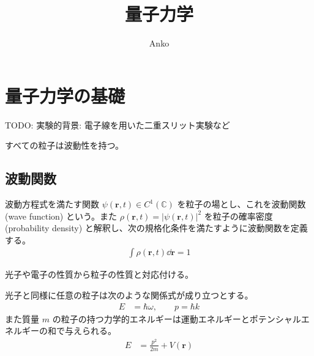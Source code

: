 \documentclass[uplatex,dvipdfmx,a4paper,11pt]{jlreq}
\title{量子力学}
\author{Anko}
\newcommand{\CC}{\mathbb{C}}
\newcommand{\rr}{\bm{r}}
\theoremstyle{definition}
\begin{document}
\maketitle
\tableofcontents
\clearpage

\section{量子力学の基礎}
TODO: 実験的背景: 電子線を用いた二重スリット実験など
\begin{axiom}[粒子の波動性]
  すべての粒子は波動性を持つ。
\end{axiom}

\subsection{波動関数}
\begin{definition}[波動関数]
  波動方程式を満たす関数 $\psi(\rr, t)\in C^1(\CC)$ を粒子の場とし、これを波動関数 (wave function) という。また $\rho(\rr, t) = |\psi(\rr, t)|^2$ を粒子の確率密度 (probability density) と解釈し、次の規格化条件を満たすように波動関数を定義する。
  \begin{align}
    \int\rho(\rr, t)\dd{\rr} = 1
  \end{align}
\end{definition}

光子や電子の性質から粒子の性質と対応付ける。
\begin{definition}[ド・ブロイの関係式]
  光子と同様に任意の粒子は次のような関係式が成り立つとする。
  \begin{align}
    E & = \hbar\omega, \qquad p = \hbar k
  \end{align}
  また質量 $m$ の粒子の持つ力学的エネルギーは運動エネルギーとポテンシャルエネルギーの和で与えられる。
  \begin{align}
    E & = \frac{p^2}{2m} + V(\rr)
  \end{align}
\end{definition}
\end{document}

